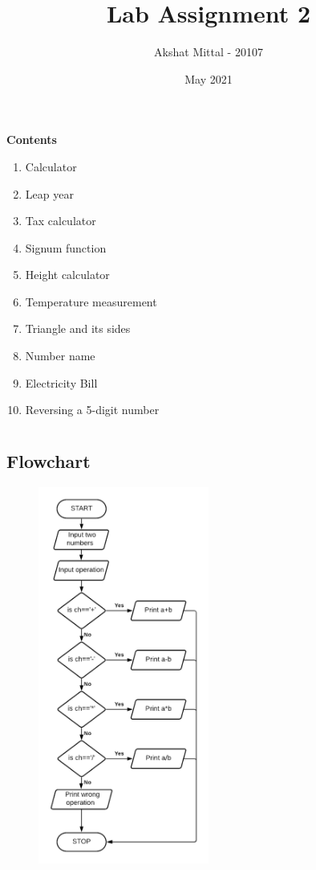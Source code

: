 \documentclass[12pt]{article}
\title{Lab Assignment 2}
\author{Akshat Mittal - 20107}
\date{May 2021}
\begin{document}
\maketitle
\vspace{7mm}
\textbf{Contents}
\vspace{7mm}
\begin{enumerate}
    \item Calculator
    \item Leap year
    \item Tax calculator
    \item Signum function
    \item Height calculator
    \item Temperature measurement
    \item Triangle and its sides
    \item Number name
    \item Electricity Bill
    \item Reversing a 5-digit number
\end{enumerate}
\newpage
\section{}
\subsection{Flowchart}
\begin{figure}[h]
    \centering
    \includegraphics[width=0.5\textwidth]{Flowchart01.png}
\end{figure}
\newpage
\end{document}
